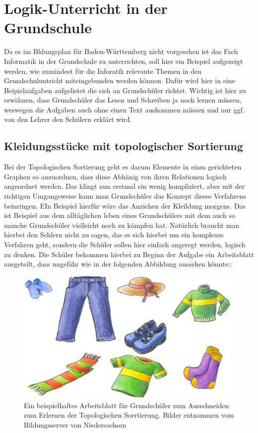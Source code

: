 \section{Logik-Unterricht in der Grundschule}
Da es im Bldungsplan für Baden-Württemberg nicht vorgesehen ist das Fach Informatik in der Grundschule zu unterrichten, soll hier ein Beispiel aufgezeigt werden, wie zumindest für die Inforatik relevante  Themen in den Grundschuluntricht miteingebunden werden können. Dafür wird hier in eine Beipielaufgaben aufgelistet die sich an Grundschüler richtet. Wichtig ist hier zu erwähnen, dass Grundschüler das Lesen und Schreiben ja noch lernen müssen, weswegen die Aufgaben auch ohne einen Text auskommen müssen und nur ggf. von den Lehrer den Schülern erklärt wird.

\subsection{Kleidungsstücke mit topologischer Sortierung}

Bei der Topologischen Sortierung geht es darum Elemente in einm gerichteten Graphen so anzuordnen, dass diese Abhänig von ihren Relationen logisch angeordnet werden. Das klingt nun erstmal ein wenig kompliziert, aber mit der richtigen Umgangsweise kann man Grundschüler das Konzept dieses Verfahrens beinringen. EIn Beispiel hierfür wäre das Anziehen der Kleildung morgens. Das ist Beispiel aus dem alltäglichen leben eines Grundschülers mit dem auch so manche Grundschüler vielleicht noch zu kämpfen hat. Natürlich braucht man hierbei den Schlern nicht zu sagen, das es sich hierbei um ein komplexes Verfahren geht, sondern die Schüler sollen hier einfach angeregt werden, logisch zu denken. Die Schüler bekommen hierbei zu Beginn der Aufgabe ein Arbeitsblatt ausgeteilt, dass ungefähr wie in der folgenden Abbildung aussehen könnte::

\begin{figure}[H]
	\centering
	\includegraphics[width=\textwidth,height=\textheight,keepaspectratio]{images/Kleidersammlung.png}
	\caption{Ein beispielhaftes Arbeitsblatt für Grundschüler zum Ausschneiden zum Erlernen der Topologischen Sorrtierung. Bilder entnommen vom Bildungsserver von Niedersachsen \cite{Kleidung}}
	\label{Beispielaufgabe anziehen}
\end{figure}

